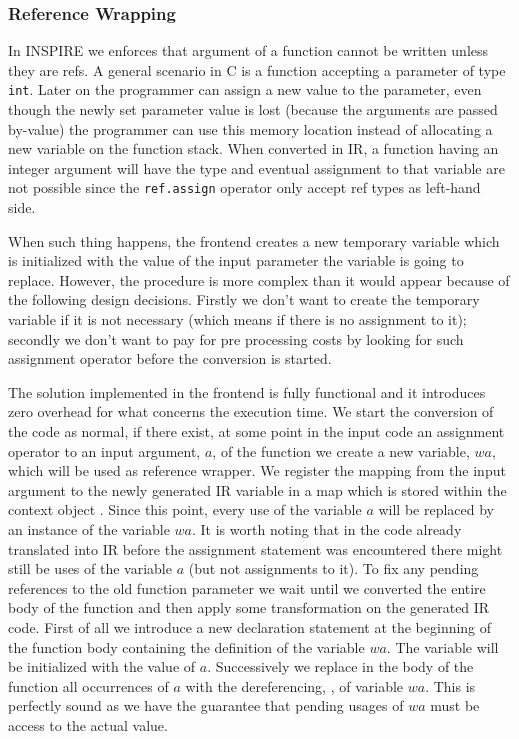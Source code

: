 \subsubsection{Reference Wrapping}
In INSPIRE we enforces that argument of a function cannot be written unless they
are refs. A general scenario in C is a function accepting a parameter of type
{\tt int}. Later on the programmer can assign a new value to the parameter, even
though the newly set parameter value is lost (because the arguments are passed
by-value) the programmer can use this memory location instead of allocating a
new variable on the function stack. When converted in IR, a function having an
integer argument will have the  type and
eventual assignment to that variable are not possible since the {\tt ref.assign}
operator only accept ref types as left-hand side. 

When such thing happens, the frontend creates a new temporary variable which is
initialized with the value of the input parameter the variable is going to
replace. However, the procedure is more complex than it would appear because of
the following design decisions. Firstly we don't want to create the temporary
variable if it  is not necessary (which means if there is no assignment to it);
secondly we don't want to pay for pre processing costs by looking for such
assignment operator before the conversion is started. 

The solution implemented in the frontend is fully functional and it introduces
zero overhead for what concerns the execution time. We start the conversion of
the code as normal, if there exist, at some point in the input code an
assignment operator to an input argument, $a$, of the function we create a new
variable, $wa$, which will be used as reference wrapper. We register the mapping
from the input argument to the newly generated IR variable in a map which is
stored within the context object . Since this point, every use
of the variable $a$ will be replaced by an instance of the variable $wa$. It is
worth noting that in the code already translated into IR before the assignment
statement was encountered there might still be uses of the variable $a$ (but not
assignments to it). To fix any pending references to the old function parameter
we wait until we converted the entire body of the function and then apply some
transformation on the generated IR code. First of all we introduce a new
declaration statement at the beginning of the function body containing the
definition of the variable $wa$. The variable will be initialized with the value
of $a$. Successively we replace in the body of the function all occurrences of
$a$ with the dereferencing, , of variable $wa$. This is
perfectly sound as we have the guarantee that pending usages of $wa$ must be
access to the actual value.

